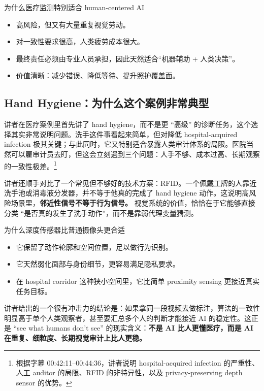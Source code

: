 \documentclass[a4paper]{article}
\begin{document}
\begin{knowledgebox}{为什么医疗监测特别适合 human-centered AI}
\begin{itemize}
    \item 高风险，但又有大量重复视觉劳动。
    \item 对一致性要求很高，人类疲劳成本很大。
    \item 最终责任必须由专业人员承担，因此天然适合``机器辅助 + 人类决策''。
    \item 价值清晰：减少错误、降低等待、提升照护覆盖面。
\end{itemize}
\end{knowledgebox}

\subsection{Hand Hygiene：为什么这个案例非常典型}

讲者在医疗案例里首先讲了 hand hygiene，而不是更 ``高级'' 的诊断任务，这个选择其实非常说明问题。洗手这件事看起来简单，但对降低 hospital-acquired infection 极其关键；与此同时，它又特别适合暴露人类审计体系的局限。医院当然可以雇审计员去盯，但这会立刻遇到三个问题：人手不够、成本过高、长期观察的一致性极差。\footnote{根据字幕 00:42:11--00:44:36，讲者说明 hospital-acquired infection 的严重性、人工 auditor 的局限、RFID 的非特异性，以及 privacy-preserving depth sensor 的优势。}

讲者还顺手对比了一个常见但不够好的技术方案：RFID。一个佩戴工牌的人靠近洗手池或消毒液分发器，并不等于他真的完成了 hand hygiene 动作。这说明高风险场景里，\textbf{邻近性信号不等于行为信号。} 视觉系统的价值，恰恰在于它能够直接分类 ``是否真的发生了洗手动作''，而不是靠弱代理变量猜测。

\begin{importantbox}{为什么深度传感器比普通摄像头更合适}
\begin{itemize}
    \item 它保留了动作轮廓和空间位置，足以做行为识别。
    \item 它天然弱化面部与身份细节，更容易满足隐私要求。
    \item 在 hospital corridor 这种狭小空间里，它比简单 proximity sensing 更接近真实任务目标。
\end{itemize}
\end{importantbox}

讲者给出的一个很有冲击力的结论是：如果拿同一段视频去做标注，算法的一致性明显高于单个人类观察者，甚至要汇总多个人的判断才能接近 AI 的稳定性。这正是 ``see what humans don't see'' 的现实含义：\textbf{不是 AI 比人更懂医疗，而是 AI 在重复、细粒度、长期视觉审计上比人更稳。}
\end{document}
